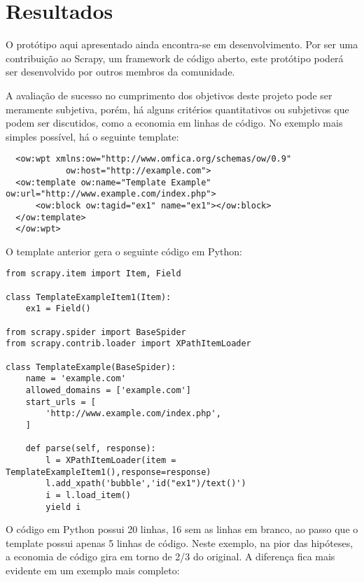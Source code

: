 \chapter{Resultados}

O protótipo aqui apresentado ainda encontra-se em desenvolvimento. Por ser uma contribuição ao Scrapy, um framework de código aberto, este protótipo poderá ser desenvolvido por outros membros da comunidade.

A avaliação de sucesso no cumprimento dos objetivos deste projeto pode ser meramente subjetiva, porém, há alguns critérios quantitativos ou subjetivos que podem ser discutidos, como a economia em linhas de código. No exemplo mais simples possível, há o seguinte template:

\begin{lstlisting}
  <ow:wpt xmlns:ow="http://www.omfica.org/schemas/ow/0.9"
            ow:host="http://example.com">
  <ow:template ow:name="Template Example" ow:url="http://www.example.com/index.php">
      <ow:block ow:tagid="ex1" name="ex1"></ow:block>
  </ow:template> 
  </ow:wpt>
\end{lstlisting}

O template anterior gera o seguinte código em Python:

\begin{lstlisting}
from scrapy.item import Item, Field

class TemplateExampleItem1(Item):
    ex1 = Field()

from scrapy.spider import BaseSpider
from scrapy.contrib.loader import XPathItemLoader

class TemplateExample(BaseSpider):
    name = 'example.com'
    allowed_domains = ['example.com']
    start_urls = [
        'http://www.example.com/index.php',
    ]
    
    def parse(self, response):
        l = XPathItemLoader(item = TemplateExampleItem1(),response=response)
        l.add_xpath('bubble','id("ex1")/text()') 
        i = l.load_item()
        yield i
\end{lstlisting}

O código em Python possui 20 linhas, 16 sem as linhas em branco, ao passo que o template possui apenas 5 linhas de código. Neste exemplo, na pior das hipóteses, a economia de código gira em torno de 2/3 do original. A diferença fica mais evidente em um exemplo mais completo:

